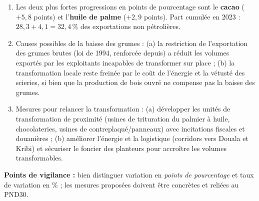 \documentclass[11pt]{article}
\begin{document}
\begin{corrige}
\begin{enumerate}
    \item Les deux plus fortes progressions en points de pourcentage sont le \textbf{cacao} ($+5{,}8$ points) et l'\textbf{huile de palme} ($+2{,}9$ points). Part cumulée en 2023 : $28{,}3 + 4{,}1 = 32{,}4\,\%$ des exportations non pétrolières.
    \item Causes possibles de la baisse des grumes : (a) la restriction de l'exportation des grumes brutes (loi de 1994, renforcée depuis) a réduit les volumes exportés par les exploitants incapables de transformer sur place ; (b) la transformation locale reste freinée par le coût de l'énergie et la vétusté des scieries, si bien que la production de bois ouvré ne compense pas la baisse des grumes.
    \item Mesures pour relancer la transformation : (a) développer les unités de transformation de proximité (usines de trituration du palmier à huile, chocolateries, usines de contreplaqué/panneaux) avec incitations fiscales et douanières ; (b) améliorer l'énergie et la logistique (corridors vers Douala et Kribi) et sécuriser le foncier des planteurs pour accroître les volumes transformables.
\end{enumerate}
\textbf{Points de vigilance :} bien distinguer variation en \emph{points de pourcentage} et taux de variation en \% ; les mesures proposées doivent être concrètes et reliées au PND30.
\end{corrige}
\end{document}
